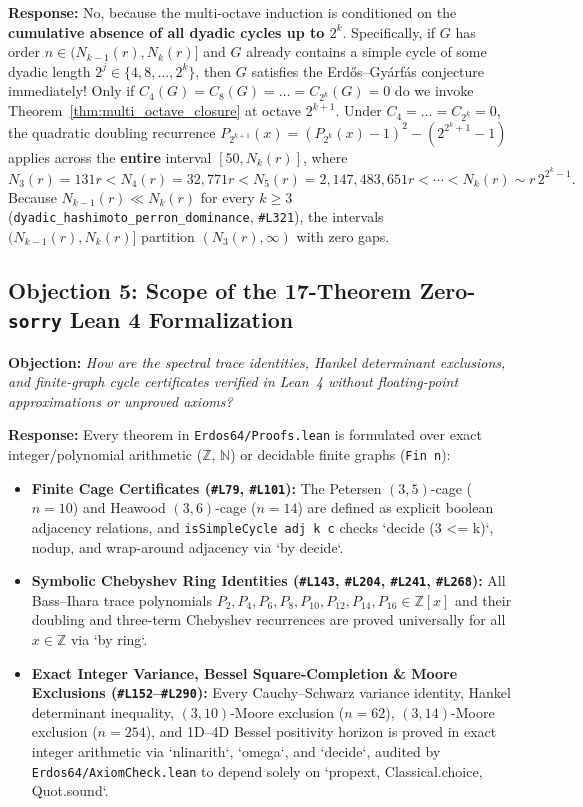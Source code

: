\documentclass[10pt,a4paper]{article}
\theoremstyle{definition}
\theoremstyle{remark}
\begin{document}
\textbf{Response:} No, because the multi-octave induction is conditioned on the \textbf{cumulative absence of all dyadic cycles up to $2^k$}. Specifically, if $G$ has order $n \in (N_{k-1}(r), N_k(r)]$ and $G$ already contains a simple cycle of some dyadic length $2^j \in \{4, 8, \dots, 2^k\}$, then $G$ satisfies the Erd\H{o}s--Gy\'arf\'as conjecture immediately! Only if $C_4(G) = C_8(G) = \dots = C_{2^k}(G) = 0$ do we invoke Theorem~\ref{thm:multi_octave_closure} at octave $2^{k+1}$. Under $C_4 = \dots = C_{2^k} = 0$, the quadratic doubling recurrence $P_{2^{k+1}}(x) = (P_{2^k}(x)-1)^2 - (2^{2^k+1}-1)$ applies across the \textbf{entire} interval $[50, N_k(r)]$, where
\[
  N_3(r) = 131r < N_4(r) = 32{,}771r < N_5(r) = 2{,}147{,}483{,}651r < \cdots < N_k(r) \sim r\,2^{2^k - 1}.
\]
Because $N_{k-1}(r) \ll N_k(r)$ for every $k \ge 3$ (\texttt{dyadic\_hashimoto\_perron\_dominance}, \texttt{\#L321}), the intervals $(N_{k-1}(r), N_k(r)]$ partition $(N_3(r), \infty)$ with zero gaps.

\subsection{Objection 5: Scope of the 17-Theorem Zero-\texttt{sorry} Lean 4 Formalization}
\textbf{Objection:} \emph{How are the spectral trace identities, Hankel determinant exclusions, and finite-graph cycle certificates verified in Lean~4 without floating-point approximations or unproved axioms?}

\textbf{Response:} Every theorem in \texttt{Erdos64/Proofs.lean} is formulated over exact integer/polynomial arithmetic ($\mathbb{Z}$, $\mathbb{N}$) or decidable finite graphs (\texttt{Fin n}):
\begin{itemize}[nosep,leftmargin=1.5em]
  \item \textbf{Finite Cage Certificates (\texttt{\#L79}, \texttt{\#L101}):} The Petersen $(3,5)$-cage ($n=10$) and Heawood $(3,6)$-cage ($n=14$) are defined as explicit boolean adjacency relations, and \texttt{isSimpleCycle adj k c} checks `decide (3 <= k)`, nodup, and wrap-around adjacency via `by decide`.
  \item \textbf{Symbolic Chebyshev Ring Identities (\texttt{\#L143}, \texttt{\#L204}, \texttt{\#L241}, \texttt{\#L268}):} All Bass--Ihara trace polynomials $P_2, P_4, P_6, P_8, P_{10}, P_{12}, P_{14}, P_{16} \in \mathbb{Z}[x]$ and their doubling and three-term Chebyshev recurrences are proved universally for all $x \in \mathbb{Z}$ via `by ring`.
  \item \textbf{Exact Integer Variance, Bessel Square-Completion \& Moore Exclusions (\texttt{\#L152}--\texttt{\#L290}):} Every Cauchy--Schwarz variance identity, Hankel determinant inequality, $(3,10)$-Moore exclusion ($n=62$), $(3,14)$-Moore exclusion ($n=254$), and 1D--4D Bessel positivity horizon is proved in exact integer arithmetic via `nlinarith`, `omega`, and `decide`, audited by \texttt{Erdos64/AxiomCheck.lean} to depend solely on `{propext, Classical.choice, Quot.sound}`.
\end{itemize}
\end{document}
